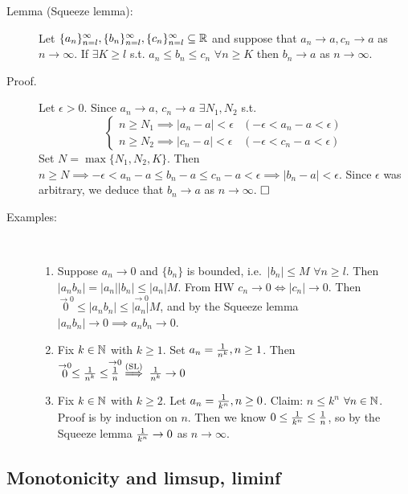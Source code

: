 \documentclass[letterpaper,11pt]{article}
\begin{document}
\begin{description}
\begin{description}
  \end{description}



\item[Lemma (Squeeze lemma):] Let $\{a_n\}_{n=l}^\infty,
    \{b_n\}_{n=l}^\infty,\{c_n\}_{n=l}^\infty\subseteq\mathbb{R}$ and suppose
    that $a_n\to a, c_n\to a$ as $n\to\infty$. If $\exists K\ge l$ s.t.
    $a_n\le b_n\le c_n$ $\forall n\ge K$ then $b_n\to a$ as $n\to\infty$.

\item[Proof.] Let $\epsilon >0$. Since $a_n\to a$, $c_n\to a$
    $\exists N_1,N_2$ s.t. \[
      \begin{cases}
      n\ge N_1 \implies |a_n-a|<\epsilon & (-\epsilon<a_n-a<\epsilon)\\
      n\ge N_2 \implies |c_n-a|<\epsilon & (-\epsilon<c_n-a<\epsilon)
      \end{cases}
    \]
    Set $N=\max\{N_1,N_2,K\}$. Then $n\ge N\implies -\epsilon<a_n-a\le
      b_n-a\le c_n-a<\epsilon\implies|b_n-a|<\epsilon$.
    Since $\epsilon$ was arbitrary, we deduce that $b_n\to a$ as $n\to\infty$.
    $\hfill\square$
 

 \item[Examples:]\text{}\vspace{-0.2in}\\
  \begin{enumerate}[1)]
  \item Suppose $a_n\to 0$ and $\{b_n\}$ is bounded, i.e.\ $|b_n|\le M$
      $\forall n\ge l$. Then $|a_nb_n|=|a_n||b_n|\le|a_n|M$. From HW
      $c_n\to 0\iff |c_n|\to0$. Then
      $\stackrel{\to0}{0}\le|a_nb_n|\le\stackrel{\to0}{|a_n|}M$,
      and by the Squeeze lemma $|a_nb_n|\to0\implies a_nb_n\to0$.
  \item Fix $k\in\mathbb{N}$ with $k\ge1$. Set $a_n=\frac{1}{n^k},n\ge 1$. Then
      $\stackrel{\to0}{0}\le\frac{1}{n^k}\le\stackrel{\to0}{\frac{1}{n}}
      \stackrel{\text{(SL)}}{\implies} \frac{1}{n^k}\to0$
  \item Fix $k\in\mathbb{N}$ with $k\ge2$. Let $a_n=\frac{1}{k^n},n\ge0$. Claim:
      $n\le k^n$ $\forall n\in\mathbb{N}$. Proof is by induction on $n$. Then
      we know $0\le\frac{1}{k^n}\le\frac{1}{n}$, so by the Squeeze lemma
      $\frac{1}{k^n}\to0$ as $n\to\infty$.
  \end{enumerate}

\end{description}

\subsection{Monotonicity and limsup, liminf}
\end{document}
